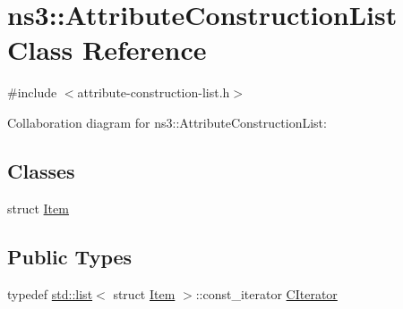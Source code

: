 \hypertarget{classns3_1_1AttributeConstructionList}{}\section{ns3\+:\+:Attribute\+Construction\+List Class Reference}
\label{classns3_1_1AttributeConstructionList}


{\ttfamily \#include $<$attribute-\/construction-\/list.\+h$>$}



Collaboration diagram for ns3\+:\+:Attribute\+Construction\+List\+:
\subsection*{Classes}
\begin{DoxyCompactItemize}
\item 
struct \hyperlink{structns3_1_1AttributeConstructionList_1_1Item}{Item}
\end{DoxyCompactItemize}
\subsection*{Public Types}
\begin{DoxyCompactItemize}
\item 
typedef \hyperlink{openflow-interface_8h_afd9bcfa176617760671b67580f536fa7}{std\+::list}$<$ struct \hyperlink{structns3_1_1AttributeConstructionList_1_1Item}{Item} $>$\+::const\+\_\+iterator \hyperlink{classns3_1_1AttributeConstructionList_aa1a046c928d9d1870a5f8ab8cb6cf6e9}{C\+Iterator}
\end{DoxyCompactItemize}

